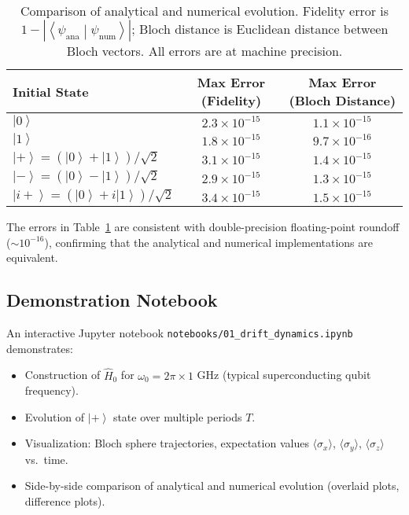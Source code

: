 \documentclass[11pt,a4paper]{article}
\theoremstyle{definition}
\theoremstyle{remark}
\newcommand{\ket}[1]{\left|#1\right\rangle}
\newcommand{\braket}[2]{\left\langle#1\middle|#2\right\rangle}
\begin{document}
\begin{table}[h]
\centering
\begin{tabular}{@{}lcc@{}}
\toprule
\textbf{Initial State} & \textbf{Max Error (Fidelity)} & \textbf{Max Error (Bloch Distance)} \\
\midrule
$\ket{0}$ & $2.3 \times 10^{-15}$ & $1.1 \times 10^{-15}$ \\
$\ket{1}$ & $1.8 \times 10^{-15}$ & $9.7 \times 10^{-16}$ \\
$\ket{+} = (\ket{0} + \ket{1})/\sqrt{2}$ & $3.1 \times 10^{-15}$ & $1.4 \times 10^{-15}$ \\
$\ket{-} = (\ket{0} - \ket{1})/\sqrt{2}$ & $2.9 \times 10^{-15}$ & $1.3 \times 10^{-15}$ \\
$\ket{i+} = (\ket{0} + i\ket{1})/\sqrt{2}$ & $3.4 \times 10^{-15}$ & $1.5 \times 10^{-15}$ \\
\bottomrule
\end{tabular}
\caption{Comparison of analytical and numerical evolution. Fidelity error is $1 - |\braket{\psi_{\text{ana}}}{\psi_{\text{num}}}|$; Bloch distance is Euclidean distance between Bloch vectors. All errors are at machine precision.}
\label{tab:validation}
\end{table}

The errors in Table~\ref{tab:validation} are consistent with double-precision floating-point roundoff ($\sim 10^{-16}$), confirming that the analytical and numerical implementations are equivalent.

\subsection{Demonstration Notebook}

An interactive Jupyter notebook \texttt{notebooks/01\_drift\_dynamics.ipynb} demonstrates:

\begin{itemize}
    \item Construction of $\hat{H}_0$ for $\omega_0 = 2\pi \times 1$ GHz (typical superconducting qubit frequency).
    \item Evolution of $\ket{+}$ state over multiple periods $T$.
    \item Visualization: Bloch sphere trajectories, expectation values $\langle \sigma_x \rangle$, $\langle \sigma_y \rangle$, $\langle \sigma_z \rangle$ vs.\ time.
    \item Side-by-side comparison of analytical and numerical evolution (overlaid plots, difference plots).
\end{itemize}
\end{document}
